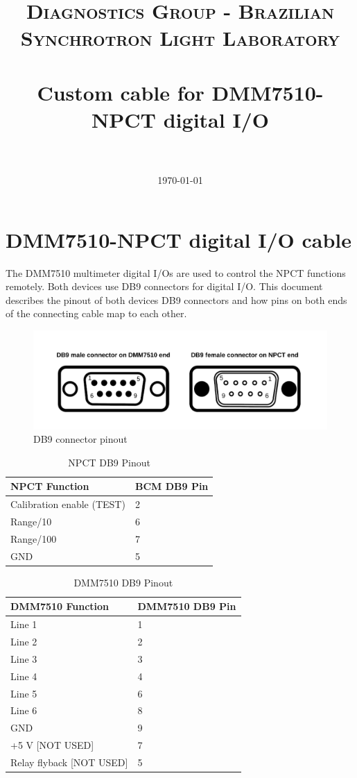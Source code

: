 \documentclass[paper=a4, fontsize=11pt]{scrartcl}
\title{
		\usefont{OT1}{bch}{b}{n}
		\normalfont \normalsize \textsc{Diagnostics Group - Brazilian Synchrotron Light Laboratory} \\ [25pt]
		\horrule{0.5pt} \\[0.4cm]
		\huge Custom cable for DMM7510-NPCT digital I/O \\
		\horrule{2pt} \\[0.5cm]
}
\author{
		\normalfont 								\normalsize
        \today
}
\date{}
\numberwithin{figure}{section}			%
\numberwithin{table}{section}			%
\begin{document}
\maketitle
\section{DMM7510-NPCT digital I/O cable}
The DMM7510 multimeter digital I/Os are used to control the NPCT functions remotely. Both devices use DB9 connectors for digital I/O. This document describes the pinout of both devices DB9 connectors and how pins on both ends of the connecting cable map to each other.

\begin{figure}[!h]
	\caption{DB9 connector pinout}
	\label{fig:db9-pins}
	\centering
	\includegraphics[width=1.0\textwidth]{npct_db9_connectors}
\end{figure}
\FloatBarrier

\begin{table}
	\center
	\caption{NPCT DB9 Pinout}
	\begin{tabular}{m{8cm} m{2cm}}
		\bfseries NPCT Function & \bfseries BCM DB9 Pin \\ \hline
		Calibration enable (TEST) & 2 \\ \hline
		Range/10 & 6 \\ \hline
		Range/100 & 7 \\ \hline
		GND & 5 \\ \hline
	\end{tabular}
\end{table}

\begin{table}
	\center
	\caption{DMM7510 DB9 Pinout}
	\begin{tabular}{m{8cm} m{2cm}}
		\bfseries DMM7510 Function & \bfseries DMM7510 DB9 Pin \\ \hline
		Line 1 & 1 \\ \hline
		Line 2 & 2 \\ \hline
		Line 3 & 3 \\ \hline
		Line 4 & 4 \\ \hline
		Line 5 & 6 \\ \hline
		Line 6 & 8 \\ \hline
		GND & 9 \\ \hline
		+5 V [NOT USED] & 7 \\ \hline
		Relay flyback [NOT USED] & 5 \\ \hline
	\end{tabular}
\end{table}
\end{document}
